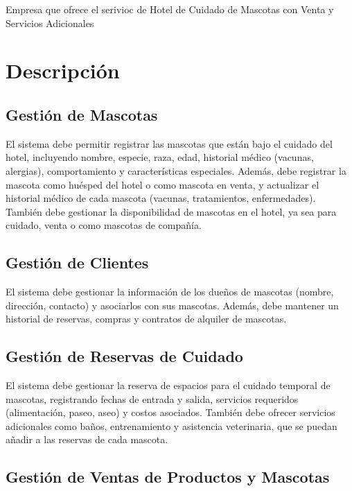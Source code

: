 \documentclass[
  letterpaper,
  DIV=11,
  numbers=noendperiod]{scrreprt}
\begin{document}
Empresa que ofrece el serivioc de Hotel de Cuidado de Mascotas con Venta
y Servicios Adicionales

\section{Descripción}\label{descripciuxf3n}

\subsection{Gestión de Mascotas}\label{gestiuxf3n-de-mascotas}

El sistema debe permitir registrar las mascotas que están bajo el
cuidado del hotel, incluyendo nombre, especie, raza, edad, historial
médico (vacunas, alergias), comportamiento y características especiales.
Además, debe registrar la mascota como huésped del hotel o como mascota
en venta, y actualizar el historial médico de cada mascota (vacunas,
tratamientos, enfermedades). También debe gestionar la disponibilidad de
mascotas en el hotel, ya sea para cuidado, venta o como mascotas de
compañía.

\subsection{Gestión de Clientes}\label{gestiuxf3n-de-clientes}

El sistema debe gestionar la información de los dueños de mascotas
(nombre, dirección, contacto) y asociarlos con sus mascotas. Además,
debe mantener un historial de reservas, compras y contratos de alquiler
de mascotas.

\subsection{Gestión de Reservas de
Cuidado}\label{gestiuxf3n-de-reservas-de-cuidado}

El sistema debe gestionar la reserva de espacios para el cuidado
temporal de mascotas, registrando fechas de entrada y salida, servicios
requeridos (alimentación, paseo, aseo) y costos asociados. También debe
ofrecer servicios adicionales como baños, entrenamiento y asistencia
veterinaria, que se puedan añadir a las reservas de cada mascota.

\subsection{Gestión de Ventas de Productos y
Mascotas}\label{gestiuxf3n-de-ventas-de-productos-y-mascotas}
\end{document}

